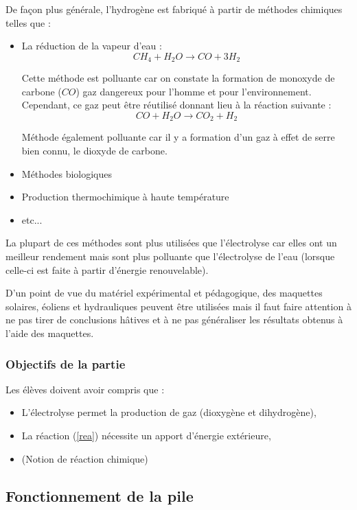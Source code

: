 \documentclass[a4paper, 11pt, twoside]{article}
\numberwithin{equation}{subsection}
\newcommand{\couleur}[1]{\ifbool{Couleur}{\color{#1}}{}}
\newcounter{th}\newcommand{\Thm}[2][]{\couleur{brown}\vspace{3ex}\boxput*(-0.4,1){\setlength{\fboxsep}{0pt}\colorbox{white}{\setlength{\fboxsep}{1ex}\Ovalbox{{\textsc{\ifstrequal{#1}{}{Théorème \stepcounter{th} \theth \phantom{}}{Théorème \stepcounter{th} \theth \phantom{} : #1}}}}}}{\setlength{\fboxsep}{7mm}\doublebox{\noindent \begin{minipage}{0.95\linewidth}\vspace{1ex}#2\end{minipage}}}\vspace{1ex}\couleur{black}}
\begin{document}
	De façon plus générale, l'hydrogène est fabriqué à partir de méthodes chimiques telles que :
	\begin{itemize}
		\item La réduction de la vapeur d'eau :
		$$
			CH_4 + H_2O \rightarrow CO + 3H_2
		$$
		
		Cette méthode est polluante car on constate la formation de monoxyde de carbone ($CO$) gaz dangereux pour l'homme et pour l'environnement. Cependant, ce gaz peut être réutilisé donnant lieu à la réaction suivante :
		$$
			CO + H_2O \rightarrow CO_2 + H_2
		$$
		
		Méthode également polluante car il y a formation d'un gaz à effet de serre bien connu, le dioxyde de carbone.
		
		\item Méthodes biologiques
		\item Production thermochimique à haute température
		\item etc...
	\end{itemize}
	
	La plupart de ces méthodes sont plus utilisées que l'électrolyse car elles ont un meilleur rendement mais sont plus polluante que l'électrolyse de l'eau (lorsque celle-ci est faite à partir d'énergie renouvelable).
	
	D'un point de vue du matériel expérimental et pédagogique, des maquettes solaires, éoliens et hydrauliques peuvent être utilisées mais il faut faire attention à ne pas tirer de conclusions hâtives et à ne pas généraliser les résultats obtenus à l'aide des maquettes.
	
	\newpage
	\subsubsection{Objectifs de la partie}
	
	Les élèves doivent avoir compris que :
	\begin{itemize}
		\item L'électrolyse permet la production de gaz (dioxygène et dihydrogène),
		\item La réaction (\ref{rea}) nécessite un apport d'énergie extérieure,
		\item (Notion de réaction chimique) 
	\end{itemize}
	
	\subsection{Fonctionnement de la pile}
	
\end{document}
